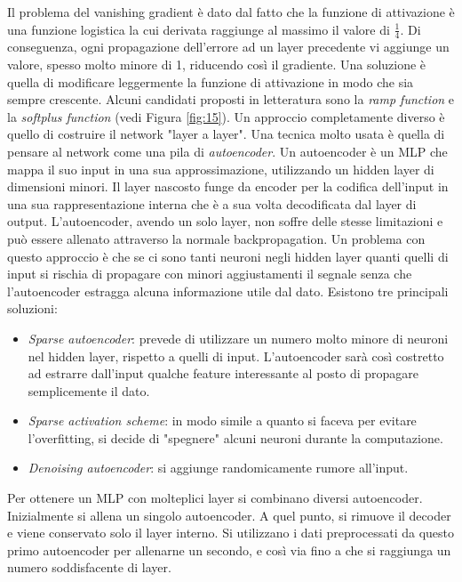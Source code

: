 \documentclass[10pt,a4paper]{article}
\begin{document}
Il problema del vanishing gradient è dato dal fatto che la funzione di attivazione è una funzione logistica la cui derivata raggiunge al massimo il valore di $\frac{1}{4}$. Di conseguenza, ogni propagazione dell'errore ad un layer precedente vi aggiunge un valore, spesso molto minore di 1, riducendo così il gradiente. Una soluzione è quella di modificare leggermente la funzione di attivazione in modo che sia sempre crescente. Alcuni candidati proposti in letteratura sono la \emph{ramp function} e la \emph{softplus function} (vedi Figura \ref{fig:15}).
Un approccio completamente diverso è quello di costruire il network "layer a layer". Una tecnica molto usata è quella di pensare al network come una pila di \emph{autoencoder}. Un autoencoder è un MLP che mappa il suo input in una sua approssimazione, utilizzando un hidden layer di dimensioni minori. Il layer nascosto funge da encoder per la codifica dell'input in una sua rappresentazione interna che è a sua volta decodificata dal layer di output. L'autoencoder, avendo un solo layer, non soffre delle stesse limitazioni e può essere allenato attraverso la normale backpropagation. Un problema con questo approccio è che se ci sono tanti neuroni negli hidden layer quanti quelli di input si rischia di propagare con minori aggiustamenti il segnale senza che l'autoencoder estragga alcuna informazione utile dal dato.
Esistono tre principali soluzioni:
\begin{itemize}
\item{\emph{Sparse autoencoder}: prevede di utilizzare un numero molto minore di neuroni nel hidden layer, rispetto a quelli di input. L'autoencoder sarà così costretto ad estrarre dall'input qualche feature interessante al posto di propagare semplicemente il dato.}
\item{\emph{Sparse activation scheme}: in modo simile a quanto si faceva per evitare l'overfitting, si decide di "spegnere" alcuni neuroni durante la computazione.}
\item{\emph{Denoising autoencoder}: si aggiunge randomicamente rumore all'input.}
\end{itemize}
Per ottenere un MLP con molteplici layer si combinano diversi autoencoder. Inizialmente si allena un singolo autoencoder. A quel punto, si rimuove il decoder e viene conservato solo il layer interno. Si utilizzano i dati preprocessati da questo primo autoencoder per allenarne un secondo, e così via fino a che si raggiunga un numero soddisfacente di layer.
\end{document}
